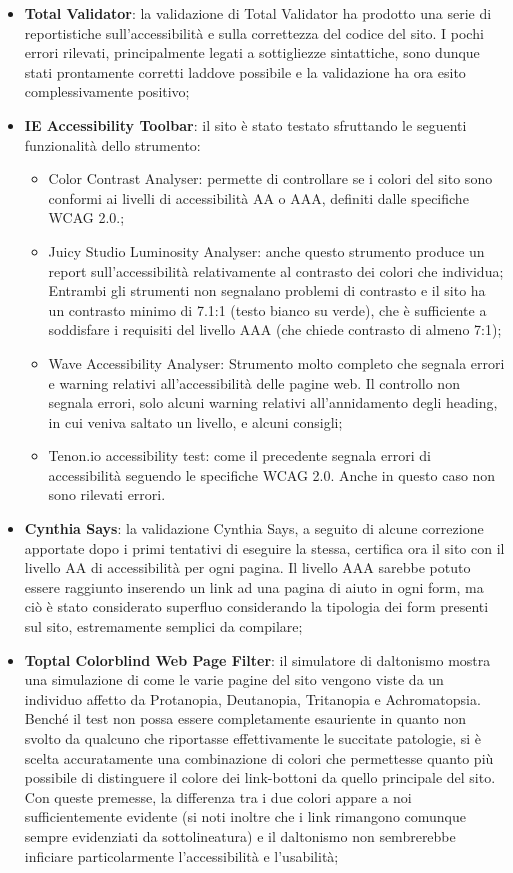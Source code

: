 \documentclass[12pt]{article}
\begin{document}
	\begin{itemize}
		\item \textbf{Total Validator}: la validazione di Total Validator ha prodotto una serie di reportistiche sull'accessibilità e sulla correttezza del codice del sito. I pochi errori rilevati, principalmente legati a sottigliezze sintattiche, sono dunque stati prontamente corretti laddove possibile e la validazione ha ora esito complessivamente positivo;
		\item \textbf{IE Accessibility Toolbar}: il sito è stato testato sfruttando le seguenti funzionalità dello strumento:
		\begin{itemize}
			\item Color Contrast Analyser: permette di controllare se i colori del sito sono conformi ai livelli di accessibilità AA o AAA, definiti dalle specifiche WCAG 2.0.; 
			\item Juicy Studio Luminosity Analyser: anche questo strumento produce un report sull'accessibilità relativamente al contrasto dei colori che individua; Entrambi gli strumenti non segnalano problemi di contrasto e il sito ha un contrasto minimo di 7.1:1 (testo bianco su verde), che è sufficiente a soddisfare i requisiti del livello AAA (che chiede contrasto di almeno 7:1);
			\item Wave Accessibility Analyser: Strumento molto completo che segnala errori e warning relativi all'accessibilità delle pagine web. Il controllo non segnala errori, solo alcuni warning relativi all'annidamento degli heading, in cui veniva saltato un livello, e alcuni consigli;
			\item Tenon.io accessibility test: come il precedente segnala errori di accessibilità seguendo le specifiche WCAG 2.0. Anche in questo caso non sono rilevati errori.
		\end{itemize}
		\item \textbf{Cynthia Says}: la validazione Cynthia Says, a seguito di alcune correzione apportate dopo i primi tentativi di eseguire la stessa, certifica ora il sito con il livello AA di accessibilità per ogni pagina. Il livello AAA sarebbe potuto essere raggiunto inserendo un link ad una pagina di aiuto in ogni form, ma ciò è stato considerato superfluo considerando la tipologia dei form presenti sul sito, estremamente semplici da compilare;
		\item \textbf{Toptal Colorblind Web Page Filter}: il simulatore di daltonismo mostra una simulazione di come le varie pagine del sito vengono viste da un individuo affetto da Protanopia, Deutanopia, Tritanopia e Achromatopsia. Benché il test non possa essere completamente esauriente in quanto non svolto da qualcuno che riportasse effettivamente le succitate patologie, si è scelta accuratamente una combinazione di colori che permettesse quanto più possibile di distinguere il colore dei link-bottoni da quello principale del sito. Con queste premesse, la differenza tra i due colori appare a noi sufficientemente evidente (si noti inoltre che i link rimangono comunque sempre evidenziati da sottolineatura) e il daltonismo non sembrerebbe inficiare particolarmente l'accessibilità e l'usabilità;

\end{itemize}
\end{document}
